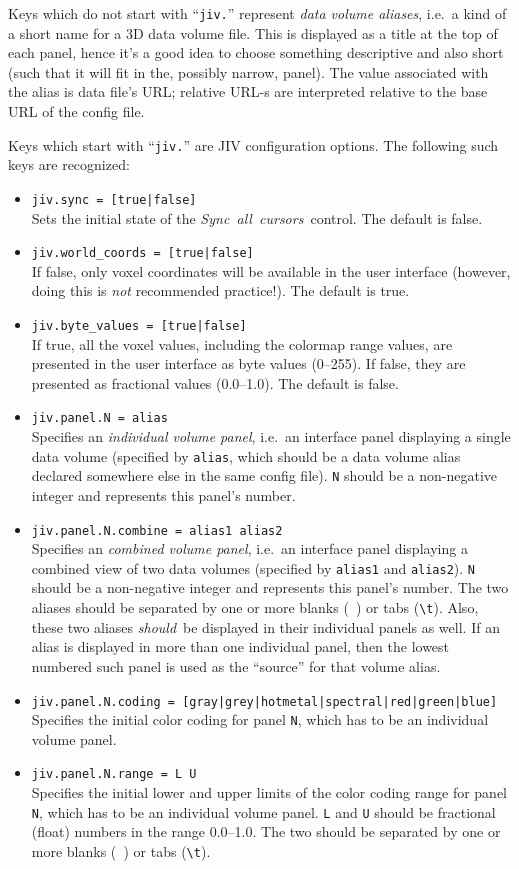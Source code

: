 Keys which do not start with ``\verb+jiv.+'' represent {\em data
  volume aliases}, i.e.\ a kind of a short name for a 3D data volume
file. This is displayed as a title at the top of each panel, hence
it's a good idea to choose something descriptive and also short (such
that it will fit in the, possibly narrow, panel). The value associated
with the alias is data file's URL\@; relative URL-s are interpreted
relative to the base URL of the config file.

Keys which start with ``\verb+jiv.+'' are JIV configuration
options. The following such keys are recognized:
\begin{itemize}
\item \verb+jiv.sync = [true|false]+ \\
  Sets the initial state of the \mbox{\em Sync all cursors}\ control.
  The default is false.
\item \verb+jiv.world_coords = [true|false]+ \\
  If false, only voxel coordinates will be available in the user
  interface (however, doing this is \emph{not} recommended practice!).
  The default is true.
\item \verb+jiv.byte_values = [true|false]+ \\
  If true, all the voxel values, including the colormap range values,
  are presented in the user interface as byte values (0--255). If
  false, they are presented as fractional values (0.0--1.0). The
  default is false.
\item \verb+jiv.panel.N = alias+ \\
  Specifies an {\em individual volume panel}, i.e.\ an interface panel
  displaying a single data volume (specified by \verb+alias+, which
  should be a data volume alias declared somewhere else in the same
  config file).  \verb+N+ should be a non-negative integer and
  represents this panel's number.
\item \verb+jiv.panel.N.combine = alias1 alias2+ \\
  Specifies an {\em combined volume panel}, i.e.\ an interface panel
  displaying a combined view of two data volumes (specified by
  \verb+alias1+ and \verb+alias2+). \verb+N+ should be a non-negative
  integer and represents this panel's number. The two aliases should
  be separated by one or more blanks (\verb*+ +) or tabs (\verb+\t+).
  Also, these two aliases {\em should}\ be displayed in their
  individual panels as well. If an alias is displayed in more than one
  individual panel, then the lowest numbered such panel is used as the
  ``source'' for that volume alias.
\item \verb+jiv.panel.N.coding = [gray|grey|hotmetal|spectral|red|green|blue]+ \\
  Specifies the initial color coding for panel \verb+N+, which has to
  be an individual volume panel.
\item \verb+jiv.panel.N.range = L U+ \\
  Specifies the initial lower and upper limits of the color coding
  range for panel \verb+N+, which has to be an individual volume
  panel. \verb+L+ and \verb+U+ should be fractional (float) numbers in
  the range 0.0--1.0.  The two should be separated by one or more
  blanks (\verb*+ +) or tabs (\verb+\t+).
\end{itemize}
